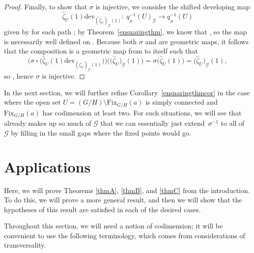 \documentclass[10pt,a4paper]{amsart}
\numberwithin{equation}{section}
\theoremstyle{definition}
\DeclareMathOperator{\Hol}{\mathrm{Hol}}
\DeclareMathOperator{\Path}{Path}
\begin{document}
\begin{proof}
Finally, to show that $\sigma$ is injective, we consider the shifted developing map \[\hat{\zeta}_U(1)\mathrm{dev}_{(\hat{\zeta}_U)_\mathscr{G}(1)}\colon \ q_{{}_H}^{-1}(U)_\mathscr{G}\to q_{{}_H}^{-1}(U)\] given by  for each path \smash{$\gamma\in\Path_{(\hat{\zeta}_U)_\mathscr{G}(1)}\bigl(q_{{}_H}^{-1}(U)_\mathscr{G}\bigr)$}; by Theorem~\ref{ensnaringthm}, we know that \smash{$\Hol_{(\hat{\zeta}_U)_\mathscr{G}(1)}\bigl(q_{{}_H}^{-1}(U)_\mathscr{G},\omega\bigr)=\{e\}$}, so the map  is necessarily well defined on . Because both $\sigma$ and  are geometric maps, it follows that the composition  is a geometric map from  to itself such that \[\bigl(\sigma\circ\bigl(\hat{\zeta}_U(1)\mathrm{dev}_{(\hat{\zeta}_U)_\mathscr{G}(1)}\bigr)\bigr) \bigl(\bigl(\hat{\zeta}_U\bigr)_\mathscr{G}(1)\bigr)=\sigma\bigl(\hat{\zeta}_U(1)\bigr) =\bigl(\hat{\zeta}_U\bigr)_\mathscr{G}(1),\] so , hence $\sigma$ is injective. \end{proof}

In the next section, we will further refine Corollary~\ref{ensnaringthmcor} in the case where the open set $U=(G/H)\setminus\mathrm{Fix}_{G/H}(a)$ is simply connected and $\mathrm{Fix}_{G/H}(a)$ has codimension at least two. For such situations, we will see that  already makes up so much of $\mathscr{G}$ that we can essentially just extend~$\sigma^{-1}$ to all of~$\mathscr{G}$ by filling in the small gaps where the fixed points would go.

\section{Applications}\label{applications}
Here, we will prove Theorems \ref{thmA}, \ref{thmB}, and \ref{thmC} from the introduction. To do this, we will prove a more general result, and then we will show that the hypotheses of this result are satisfied in each of the desired cases.

Throughout this section, we will need a notion of codimension; it will be convenient to use the following terminology, which comes from considerations of transversality.
\end{document}

